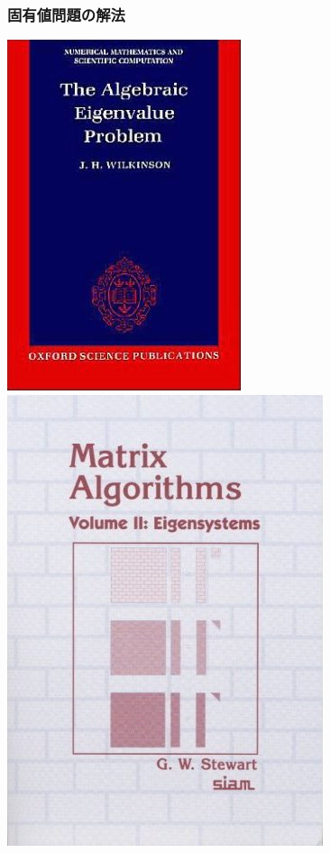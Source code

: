 \begin{frame}
  \frametitle{固有値問題の解法}
  \begin{center}
    \includegraphics[height=0.6\textheight]{figure/AlgebraicEigenvalue.jpg} \ \
    \includegraphics[height=0.6\textheight]{figure/MatrixAlgorithms.jpg} \ \

\end{center}
\end{frame}
